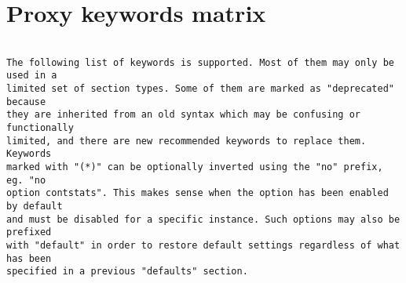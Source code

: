 
\section{Proxy keywords matrix}

\begin{verbatim}

The following list of keywords is supported. Most of them may only be used in a
limited set of section types. Some of them are marked as "deprecated" because
they are inherited from an old syntax which may be confusing or functionally
limited, and there are new recommended keywords to replace them. Keywords
marked with "(*)" can be optionally inverted using the "no" prefix, eg. "no
option contstats". This makes sense when the option has been enabled by default
and must be disabled for a specific instance. Such options may also be prefixed
with "default" in order to restore default settings regardless of what has been
specified in a previous "defaults" section.



\end{verbatim}
